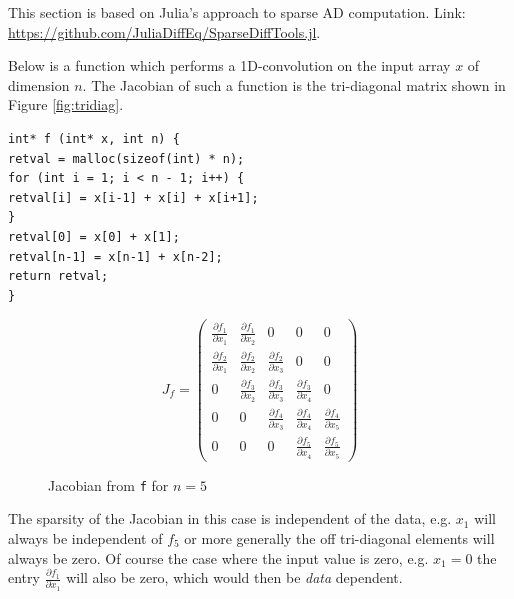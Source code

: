 This section is based on Julia's approach to sparse AD computation. 
Link: \url{https://github.com/JuliaDiffEq/SparseDiffTools.jl}. 

Below is a function which performs a 1D-convolution on the input array $x$ of dimension $n$. 
The Jacobian of such a function is the tri-diagonal matrix shown in Figure \ref{fig:tridiag}. 
\begin{verbatim}
int* f (int* x, int n) {
retval = malloc(sizeof(int) * n);
for (int i = 1; i < n - 1; i++) {
retval[i] = x[i-1] + x[i] + x[i+1];
}
retval[0] = x[0] + x[1];
retval[n-1] = x[n-1] + x[n-2];
return retval;
}
\end{verbatim}
\begin{figure}[H]
	$$ J_{f} = \left(\begin{matrix}
	\frac{\partial f_1}{\partial x_1} & \frac{\partial f_1}{\partial x_2} & 0 & 0 & 0 \\
	\frac{\partial f_2}{\partial x_1}& \frac{\partial f_2}{\partial x_2} & \frac{\partial f_2}{\partial x_3} & 0 & 0\\
	0 & \frac{\partial f_3}{\partial x_2} & \frac{\partial f_3}{\partial x_3} & \frac{\partial f_3}{\partial x_4} & 0\\
	0 & 0 & \frac{\partial f_4}{\partial x_3} & \frac{\partial f_4}{\partial x_4} & \frac{\partial f_4}{\partial x_5} \\
	0 & 0 & 0 & \frac{\partial f_5}{\partial x_4} & \frac{\partial f_5}{\partial x_5}
	\end{matrix}\right) $$
	\caption{Jacobian from \texttt{f} for $n=5$}

\end{figure}
The sparsity of the Jacobian in this case is independent of the data, e.g. $x_1$ will always be independent of $f_5$ 
or more generally the off tri-diagonal elements will always be zero. 
Of course the case where the input value is zero, e.g. $x_1 = 0$  the entry $\frac{\partial f_1}{\partial x_1}$ will also be zero, which would then be \emph{data} dependent.


